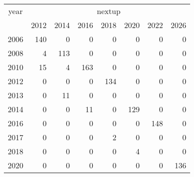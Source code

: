 \footnotesize\begin{tabular}[t]{lrrrrrrr}
\toprule
\multicolumn{1}{c}{year} & \multicolumn{7}{c}{nextup} \\
\cmidrule(l{3pt}r{3pt}){1-1} \cmidrule(l{3pt}r{3pt}){2-8}
  & 2012 & 2014 & 2016 & 2018 & 2020 & 2022 & 2026\\
\midrule
2006 & 140 & 0 & 0 & 0 & 0 & 0 & 0\\
2008 & 4 & 113 & 0 & 0 & 0 & 0 & 0\\
2010 & 15 & 4 & 163 & 0 & 0 & 0 & 0\\
2012 & 0 & 0 & 0 & 134 & 0 & 0 & 0\\
2013 & 0 & 11 & 0 & 0 & 0 & 0 & 0\\
2014 & 0 & 0 & 11 & 0 & 129 & 0 & 0\\
2016 & 0 & 0 & 0 & 0 & 0 & 148 & 0\\
2017 & 0 & 0 & 0 & 2 & 0 & 0 & 0\\
2018 & 0 & 0 & 0 & 0 & 4 & 0 & 0\\
2020 & 0 & 0 & 0 & 0 & 0 & 0 & 136\\
\bottomrule
\end{tabular}
